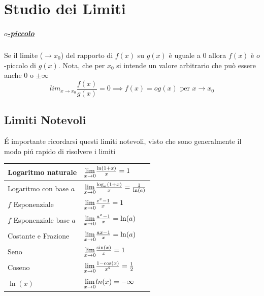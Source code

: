 \documentclass[12pt, a4paper, openany]{book}
\begin{document}
\chapter{Studio dei Limiti}

\paragraph*{\underline{$o$-piccolo}} Se il limite ($\to x_0$) del rapporto di $f(x)$ su $g(x)$ è uguale a $0$ allora $f(x)$ è $o$-piccolo di $g(x)$.
Nota, che per $x_0$ si intende un valore arbitrario che può essere anche 0 o $\pm \infty$
$$lim_{x\to x_0} \frac{f(x)}{g(x)} = 0 \implies f(x) = o g(x)\text{ per } x\to x_0 $$

\section{Limiti Notevoli}
É importante ricordarsi questi limiti notevoli, visto che sono generalmente il modo piú rapido di risolvere i limiti

\begin{tabularx}{\textwidth}{ |X|X| }
	\hline
	Logaritmo naturale        & $\underset{x \to 0}{\lim} \frac{\ln(1+x)}{x} = 1 $                   \\
	\hline
	Logaritmo con base $a$    & $\underset{x \to 0}{\lim} \frac{\log_a(1+x)}{x} = \frac{1}{\ln(a)} $ \\
	\hline
	$f$ Esponenziale          & $\underset{x \to 0}{\lim} \frac{e^x-1}{x} = 1$                       \\
	\hline
	$f$ Esponenziale base $a$ & $\underset{x \to 0}{\lim} \frac{a^x-1}{x} = \ln(a)$                  \\
	\hline
	Costante e Frazione       & $\underset{x \to 0}{\lim}\frac{ax -1}{x} = \ln(a)$                   \\
	\hline
	Seno                      & $\underset{x \to 0}{\lim}\frac{\sin(x)}{x} = 1$                      \\
	\hline
	Coseno                    & $\underset{x \to 0}{\lim} \frac{1-\cos(x)}{x^2} = \frac{1}{2} $      \\
	\hline
	\hline
	$\ln(x)$                  & $\underset{x \to 0}{\lim} ln(x) = -\infty $                          \\ %
	\hline
\end{tabularx}

\pagebreak
\end{document}
